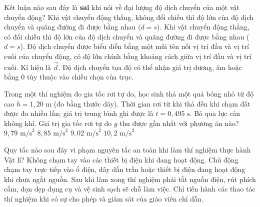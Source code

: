 	\begin{ex}%
		Kết luận nào sau đây là \textbf{sai} khi nói về đại lượng độ dịch chuyển của một vật chuyển động?
		\choice
		{Khi vật chuyển động thẳng, không đổi chiều thì độ lớn của độ dịch chuyển và quãng đường đi được bằng nhau ($d = s$).}
		{\True Khi vật chuyển động thẳng, có đổi chiều thì độ lớn của độ dịch chuyển và quãng đường đi được bằng nhau ($d = s$).}
		{Độ dịch chuyển được biểu diễn bằng một mũi tên nối vị trí đầu và vị trí cuối của chuyển động, có độ lớn chính bằng khoảng cách giữa vị trí đầu và vị trí cuối. Kí hiệu là $\vec{d}$.}
		{Độ dịch chuyển tọa độ có thể nhận giá trị dương, âm hoặc bằng 0 tùy thuộc vào chiều chọn của trục.}
	\end{ex}
	
	\begin{ex}%
		Trong một thí nghiệm đo gia tốc rơi tự do, học sinh thả một quả bóng nhỏ từ độ cao $h = 1,20\text{ m}$ (đo bằng thước dây). Thời gian rơi từ khi thả đến khi chạm đất được đo nhiều lần; giá trị trung bình ghi được là $t = 0,495\text{ s}$. Bỏ qua lực cản không khí. Giá trị gia tốc rơi tự do $g$ thu được gần nhất với phương án nào?
		\choice
		{\True $9,79\text{ m/s}^2$}
		{$8,85\text{ m/s}^2$}
		{$9,02\text{ m/s}^2$}
		{$10,2\text{ m/s}^2$}
	\end{ex}
	
	\begin{ex}%
		Quy tắc nào sau đây vi phạm nguyên tắc an toàn khi làm thí nghiệm thực hành Vật lí?
		\choice
		{Không chạm tay vào các thiết bị điện khi đang hoạt động.}
		{\True Chủ động chạm tay trực tiếp vào ổ điện, dây dẫn trần hoặc thiết bị điện đang hoạt động khi chưa ngắt nguồn.}
		{Sau khi làm xong thí nghiệm phải tắt nguồn điện, rút phích cắm, dọn dẹp dụng cụ và vệ sinh sạch sẽ chỗ làm việc.}
		{Chỉ tiến hành các thao tác thí nghiệm khi có sự cho phép và giám sát của giáo viên chỉ dẫn.}
	\end{ex}
	
